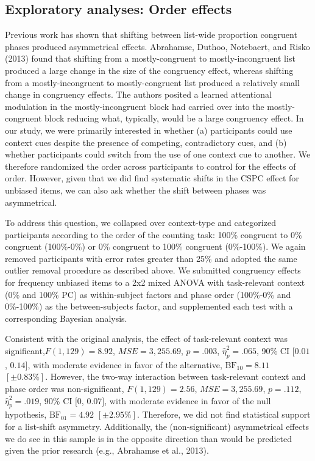 \documentclass[english,,man,floatsintext]{apa6}
\begin{document}
\hypertarget{exploratory-analyses-order-effects}{%
\subsection{Exploratory analyses: Order effects}\label{exploratory-analyses-order-effects}}



Previous work has shown that shifting between list-wide proportion congruent phases produced asymmetrical effects. Abrahamse, Duthoo, Notebaert, and Risko (2013) found that shifting from a mostly-congruent to mostly-incongruent list produced a large change in the size of the congruency effect, whereas shifting from a mostly-incongruent to mostly-congruent list produced a relatively small change in congruency effects. The authors posited a learned attentional modulation in the mostly-incongruent block had carried over into the mostly-congruent block reducing what, typically, would be a large congruency effect. In our study, we were primarily interested in whether (a) participants could use context cues despite the presence of competing, contradictory cues, and (b) whether participants could switch from the use of one context cue to another. We therefore randomized the order across participants to control for the effects of order. However, given that we did find systematic shifts in the CSPC effect for unbiased items, we can also ask whether the shift between phases was asymmetrical.

To address this question, we collapsed over context-type and categorized participants according to the order of the counting task: 100\% congruent to 0\% congruent (100\%-0\%) or 0\% congruent to 100\% congruent (0\%-100\%). We again removed participants with error rates greater than 25\% and adopted the same outlier removal procedure as described above. We submitted congruency effects for frequency unbiased items to a 2x2 mixed ANOVA with task-relevant context (0\% and 100\% PC) as within-subject factors and phase order (100\%-0\% and 0\%-100\%) as the between-subjects factor, and supplemented each test with a corresponding Bayesian analysis.

Consistent with the original analysis, the effect of task-relevant context was significant,\(F(1, 129) = 8.92\), \(\mathit{MSE} = 3,255.69\), \(p = .003\), \(\hat{\eta}^2_p = .065\), 90\% CI \([0.01\), \(0.14]\), with moderate evidence in favor of the alternative, \(\mathrm{BF}_{\textrm{10}} = 8.11\) \([\pm 0.83\%]\). However, the two-way interaction between task-relevant context and phase order was non-significant, \(F(1, 129) = 2.56\), \(\mathit{MSE} = 3,255.69\), \(p = .112\), \(\hat{\eta}^2_p = .019\), 90\% CI \([0\), \(0.07]\), with moderate evidence in favor of the null hypothesis, \(\mathrm{BF}_{\textrm{01}} = 4.92\) \([\pm 2.95\%]\). Therefore, we did not find statistical support for a list-shift asymmetry. Additionally, the (non-significant) asymmetrical effects we do see in this sample is in the opposite direction than would be predicted given the prior research (e.g., Abrahamse et al., 2013).
\end{document}
